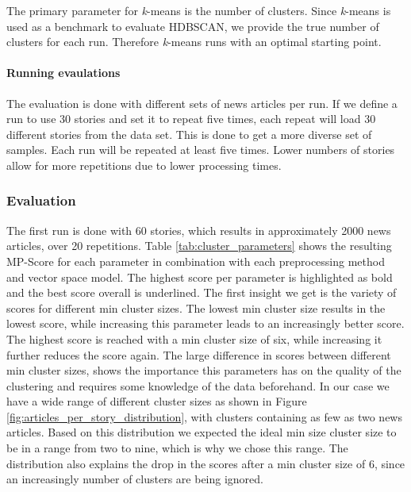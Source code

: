 The primary parameter for \textit{k}-means is the number of clusters. Since \textit{k}-means is used as a benchmark to evaluate HDBSCAN, we provide the true number of clusters for each run. Therefore \textit{k}-means runs with an optimal starting point. 

\paragraph{Running evaulations} The evaluation is done with different sets of news articles per run. If we define a run to use 30 stories and set it to repeat five times, each repeat will load 30 different stories from the data set. This is done to get a more diverse set of samples. Each run will be repeated at least five times. Lower numbers of stories allow for more repetitions due to lower processing times.   

\subsubsection{Evaluation}

The first run is done with 60 stories, which results in approximately 2000 news articles, over 20 repetitions. Table \ref{tab:cluster_parameters} shows the resulting MP-Score for each parameter in combination with each preprocessing method and vector space model. The highest score per parameter is highlighted as bold and the best score overall is underlined. The first insight we get is the variety of scores for different min cluster sizes. The lowest min cluster size results in the lowest score, while increasing this parameter leads to an increasingly better score. The highest score is reached with a min cluster size of six, while increasing it further reduces the score again. The large difference in scores between different min cluster sizes, shows the importance this parameters has on the quality of the clustering and requires some knowledge of the data beforehand. In our case we have a wide range of different cluster sizes as shown in Figure \ref{fig:articles_per_story_distribution}, with clusters containing as few as two news articles. Based on this distribution we expected the ideal min size cluster size to be in a range from two to nine, which is why we chose this range. The distribution also explains the drop in the scores after a min cluster size of 6, since an increasingly number of clusters are being ignored.

